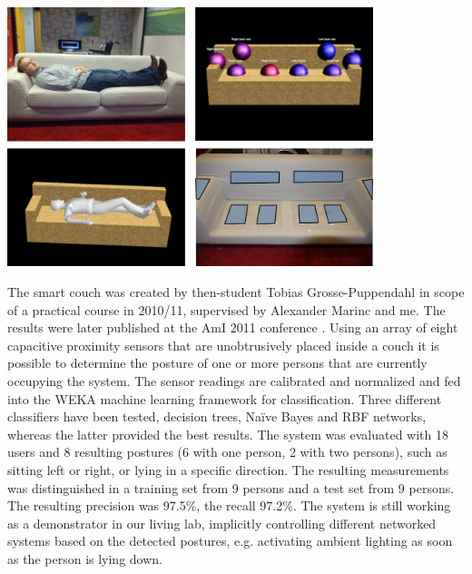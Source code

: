 \begin{minipage}{\linewidth}
\centering
\includegraphics[width=0.8\textwidth]{images/other_proto_smartcouch}
\label{fig:other_proto_smartcouch}
\end{minipage}

The smart couch was created by then-student Tobias Grosse-Puppendahl in scope of a practical course in 2010/11, supervised by Alexander Marinc and me. The results were later published at the AmI 2011 conference \cite{Couch2011}. Using an array of eight capacitive proximity sensors that are unobtrusively placed inside a couch it is possible to determine the posture of one or more persons that are currently occupying the system. The sensor readings are calibrated and normalized and fed into the WEKA machine learning framework for classification. Three different classifiers have been tested, decision trees, Na\"{i}ve Bayes and RBF networks, whereas the latter provided the best results. The system was evaluated with 18 users and 8 resulting postures (6 with one person, 2 with two persons), such as sitting left or right, or lying in a specific direction. The resulting measurements was distinguished in a training set from 9 persons and a test set from 9 persons. The resulting precision was 97.5\%, the recall 97.2\%. The system is still working as a demonstrator in our living lab, implicitly controlling different networked systems based on the detected postures, e.g. activating ambient lighting as soon as the person is lying down.


